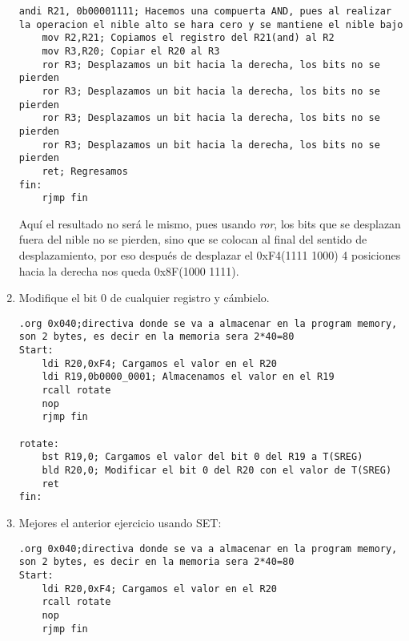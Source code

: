 \documentclass[
	12pt, %
	fleqn, %
	a4paper, %
	oneside, %
]{LegrandOrangeBook}
\begin{document}
\begin{enumerate}
\begin{lstlisting}[language={[RISC-V]Assembler},frame=single,caption={Usando FOR},captionpos=b,numbers=none]
	andi R21, 0b00001111; Hacemos una compuerta AND, pues al realizar la operacion el nible alto se hara cero y se mantiene el nible bajo
	mov R2,R21; Copiamos el registro del R21(and) al R2
	mov R3,R20; Copiar el R20 al R3
	ror R3; Desplazamos un bit hacia la derecha, los bits no se pierden
	ror R3; Desplazamos un bit hacia la derecha, los bits no se pierden
	ror R3; Desplazamos un bit hacia la derecha, los bits no se pierden
	ror R3; Desplazamos un bit hacia la derecha, los bits no se pierden
	ret; Regresamos
fin:
	rjmp fin
\end{lstlisting}
Aquí el resultado no será le mismo, pues usando \textit{ror}, los bits que se desplazan fuera del nible no se pierden, sino que se colocan al final del sentido de desplazamiento, por eso después de desplazar el 0xF4(1111 1000) 4 posiciones hacia la derecha nos queda 0x8F(1000 1111).
\item Modifique el bit 0 de cualquier registro y cámbielo.
\begin{lstlisting}[language={[RISC-V]Assembler},frame=single,caption={Uso de la función BST y BSI para cambiar bits específicos},captionpos=b,numbers=none]
.org 0x040;directiva donde se va a almacenar en la program memory, son 2 bytes, es decir en la memoria sera 2*40=80
Start:
	ldi R20,0xF4; Cargamos el valor en el R20
	ldi R19,0b0000_0001; Almacenamos el valor en el R19
	rcall rotate
	nop
	rjmp fin

rotate:
	bst R19,0; Cargamos el valor del bit 0 del R19 a T(SREG)
	bld R20,0; Modificar el bit 0 del R20 con el valor de T(SREG)
	ret
fin:
\end{lstlisting}
\item Mejores el anterior ejercicio usando SET:
\begin{lstlisting}[language={[RISC-V]Assembler},frame=single,caption={Uso del SET para modificar T(SREG)},captionpos=b,numbers=none]
.org 0x040;directiva donde se va a almacenar en la program memory, son 2 bytes, es decir en la memoria sera 2*40=80
Start:
	ldi R20,0xF4; Cargamos el valor en el R20
	rcall rotate
	nop
	rjmp fin


\end{lstlisting}
\end{enumerate}
\end{document}
